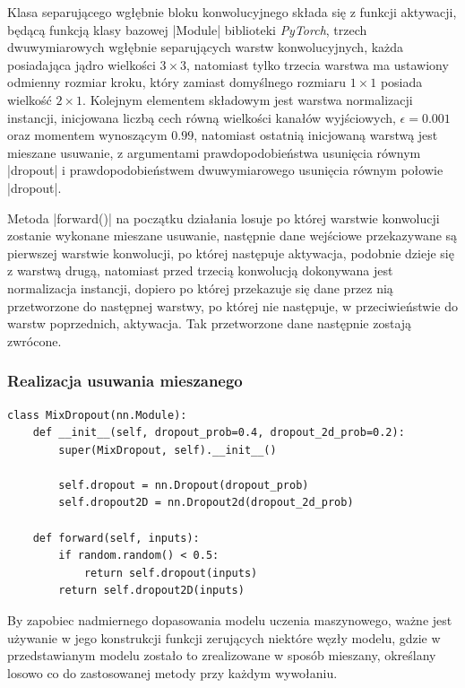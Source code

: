 Klasa separującego wgłębnie bloku konwolucyjnego składa się z funkcji aktywacji, będącą funkcją klasy bazowej \pyth|Module| biblioteki \textit{PyTorch}, trzech dwuwymiarowych wgłębnie separujących warstw konwolucyjnych, każda posiadająca jądro wielkości $3 \times 3$, natomiast tylko trzecia warstwa ma ustawiony odmienny rozmiar kroku, który zamiast domyślnego rozmiaru $1 \times 1$ posiada wielkość $2 \times 1$. Kolejnym elementem składowym jest warstwa normalizacji instancji, inicjowana liczbą cech równą wielkości kanałów wyjściowych, $\epsilon = 0.001$ oraz momentem wynoszącym $0.99$, natomiast ostatnią inicjowaną warstwą jest mieszane usuwanie, z argumentami prawdopodobieństwa usunięcia równym \pyth|dropout| i prawdopodobieństwem dwuwymiarowego usunięcia równym połowie \pyth|dropout|.

Metoda \pyth|forward()| na początku działania losuje po której warstwie konwolucji zostanie wykonane mieszane usuwanie, następnie dane wejściowe przekazywane są pierwszej warstwie konwolucji, po której następuje aktywacja, podobnie dzieje się z warstwą drugą, natomiast przed trzecią konwolucją dokonywana jest normalizacja instancji, dopiero po której przekazuje się dane przez nią przetworzone do następnej warstwy, po której nie następuje, w przeciwieństwie do warstw poprzednich, aktywacja. Tak przetworzone dane następnie zostają zwrócone.



\subsubsection{Realizacja usuwania mieszanego}

\begin{lstlisting}[caption={\pyth|MixDroput| - klasa usuwania mieszanego.}, label={mix-dropout}]
class MixDropout(nn.Module):
	def __init__(self, dropout_prob=0.4, dropout_2d_prob=0.2):
		super(MixDropout, self).__init__()
		
		self.dropout = nn.Dropout(dropout_prob)
		self.dropout2D = nn.Dropout2d(dropout_2d_prob)
	
	def forward(self, inputs):
		if random.random() < 0.5:
			return self.dropout(inputs)
		return self.dropout2D(inputs)
\end{lstlisting}

By zapobiec nadmiernego dopasowania modelu uczenia maszynowego, ważne jest używanie w jego konstrukcji funkcji zerujących niektóre węzły modelu, gdzie w przedstawianym modelu zostało to zrealizowane w sposób mieszany, określany losowo co do zastosowanej metody przy każdym wywołaniu.

